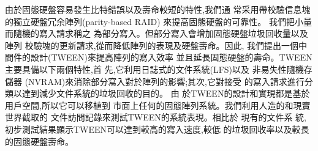 \begin{CJK*}{UTF8}{bsmi}
{
由於固態硬盤容易發生比特錯誤以及壽命較短的特性,我們通
常采用帶校驗信息塊的獨立硬盤冗余陣列(parity-based RAID)
來提高固態硬盤的可靠性。 我們把小量而隨機的寫入請求稱之
為部分寫入。但部分寫入會增加固態硬盤垃圾回收量以及陣列
校驗塊的更新請求,從而降低陣列的表現及硬盤壽命。因此,
我們提出一個中間件的設計(TWEEN)來提高陣列的寫入效率
並且延長固態硬盤的壽命。TWEEN主要具備以下兩個特性,首
先,它利用日誌式的文件系統(LFS)以及 非易失性隨機存儲器
(NVRAM)來消除部分寫入對於陣列的影響;其次,它對接受
的寫入請求進行分類以達到減少文件系統的垃圾回收的目的。 由
於TWEEN的設計和實現都是基於用戶空間,所以它可以移植到
市面上任何的固態陣列系統。我們利用人造的和現實世界截取的
文件訪問記錄來測試TWEEN的系統表現。相比於 現有的文件系
統,初步測試結果顯示TWEEN可以達到較高的寫入速度,較低
的垃圾回收率以及較長的固態硬盤壽命。}
\end{CJK*}
